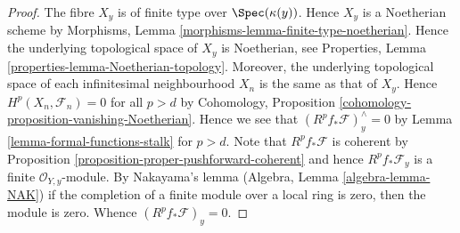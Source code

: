 \begin{proof}
The fibre $X_y$ is of finite type over $\Spec(\kappa(y))$.
Hence $X_y$ is a Noetherian scheme by
Morphisms, Lemma \ref{morphisms-lemma-finite-type-noetherian}.
Hence the underlying topological space of $X_y$ is Noetherian, see
Properties, Lemma \ref{properties-lemma-Noetherian-topology}.
Moreover, the underlying topological space of each infinitesimal
neighbourhood $X_n$ is the same as that of $X_y$.
Hence $H^p(X_n, \mathcal{F}_n) = 0$ for all $p > d$ by
Cohomology, Proposition \ref{cohomology-proposition-vanishing-Noetherian}.
Hence we see that $(R^pf_*\mathcal{F})_y^\wedge = 0$
by Lemma \ref{lemma-formal-functions-stalk} for $p > d$.
Note that $R^pf_*\mathcal{F}$ is coherent by
Proposition \ref{proposition-proper-pushforward-coherent} and
hence $R^pf_*\mathcal{F}_y$ is a finite
$\mathcal{O}_{Y, y}$-module. By Nakayama's lemma
(Algebra, Lemma \ref{algebra-lemma-NAK})
if the completion of a finite module over a local ring
is zero, then the module is zero. Whence
$(R^pf_*\mathcal{F})_y = 0$.
\end{proof}








